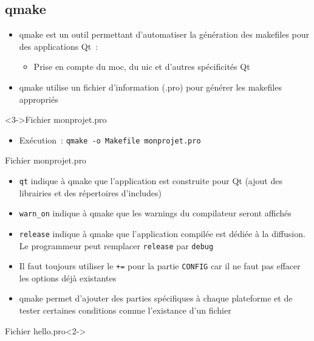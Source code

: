 \documentclass{beamer} %
\begin{document}
\subsection{qmake}
\begin{frame}
	\begin{itemize}
	\item qmake est un outil permettant d'automatiser la génération des makefiles pour des applications Qt~:
		\begin{itemize}
		\item Prise en compte du moc, du uic et d'autres spécificités Qt
		\end{itemize}
	\item<2-> qmake utilise un fichier d'information (.pro) pour générer les makefiles appropriés
	\end{itemize}
		
	\begin{exampleblock}<3->{Fichier monprojet.pro}
		
	\end{exampleblock}
	
	\begin{itemize}
	\item<4-> Exécution~: \texttt{qmake -o Makefile monprojet.pro}
	\end{itemize}
\end{frame}

\begin{frame}
	\begin{exampleblock}{Fichier monprojet.pro}
		
	\end{exampleblock}
		
	\begin{itemize}
	\item \texttt{qt} indique à qmake que l'application est construite pour Qt (ajout des librairies et des répertoires d'includes)
	\item<2-> \texttt{warn\_on} indique à qmake que les warnings du compilateur seront affichés
	\item<3-> \texttt{release} indique à qmake que l'application compilée est dédiée à la diffusion. Le programmeur peut remplacer \texttt{release} par \texttt{debug}
	\item<4-> Il faut toujours utiliser le \texttt{+=} pour la partie \texttt{CONFIG} car il ne faut pas effacer les options déjà existantes
	\end{itemize}
\end{frame}

\begin{frame}
	\begin{itemize}
	\item qmake permet d'ajouter des parties spécifiques à chaque plateforme et de tester certaines conditions comme l'existance d'un fichier
	\end{itemize}

\begin{exampleblock}{Fichier hello.pro}<2->
	
\end{exampleblock}
\end{frame}
\end{document}
